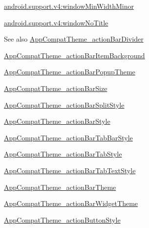 {\ttfamily \hyperlink{classandroid_1_1support_1_1v4_1_1R_1_1styleable_a49209af19fab1feaef6b49e695bf15d0}{android.\+support.\+v4\+:window\+Min\+Width\+Minor}}

{\ttfamily \hyperlink{classandroid_1_1support_1_1v4_1_1R_1_1styleable_a2434c4c955064f1b931a1059e587e1bb}{android.\+support.\+v4\+:window\+No\+Title}}

\begin{DoxySeeAlso}{See also}
\hyperlink{classandroid_1_1support_1_1v4_1_1R_1_1styleable_a0732bf3940b6c83753703acb180467fb}{App\+Compat\+Theme\+\_\+action\+Bar\+Divider} 

\hyperlink{classandroid_1_1support_1_1v4_1_1R_1_1styleable_a60558b418ddb9737883935cae40a928c}{App\+Compat\+Theme\+\_\+action\+Bar\+Item\+Background} 

\hyperlink{classandroid_1_1support_1_1v4_1_1R_1_1styleable_add3e5d5f9d1b972dd09d10ff0cc47d4d}{App\+Compat\+Theme\+\_\+action\+Bar\+Popup\+Theme} 

\hyperlink{classandroid_1_1support_1_1v4_1_1R_1_1styleable_aa92fde6683d052bff4e488f9f4dfdacc}{App\+Compat\+Theme\+\_\+action\+Bar\+Size} 

\hyperlink{classandroid_1_1support_1_1v4_1_1R_1_1styleable_ab3556694f1ba3adfd224a083e4c5b5b2}{App\+Compat\+Theme\+\_\+action\+Bar\+Split\+Style} 

\hyperlink{classandroid_1_1support_1_1v4_1_1R_1_1styleable_abfc7ed80904100dcd77301a5d21b8e1f}{App\+Compat\+Theme\+\_\+action\+Bar\+Style} 

\hyperlink{classandroid_1_1support_1_1v4_1_1R_1_1styleable_a53ff434fe900f2e065169c843ae14dd4}{App\+Compat\+Theme\+\_\+action\+Bar\+Tab\+Bar\+Style} 

\hyperlink{classandroid_1_1support_1_1v4_1_1R_1_1styleable_ace82d68d7bf21eba34ee1fc9395ad742}{App\+Compat\+Theme\+\_\+action\+Bar\+Tab\+Style} 

\hyperlink{classandroid_1_1support_1_1v4_1_1R_1_1styleable_af037c9c5d52f2269044bf14075a0a624}{App\+Compat\+Theme\+\_\+action\+Bar\+Tab\+Text\+Style} 

\hyperlink{classandroid_1_1support_1_1v4_1_1R_1_1styleable_a0a71bc29ce92a20e2a10e528565e55bf}{App\+Compat\+Theme\+\_\+action\+Bar\+Theme} 

\hyperlink{classandroid_1_1support_1_1v4_1_1R_1_1styleable_a0d30112c3d0cc880197dd311dbbf7def}{App\+Compat\+Theme\+\_\+action\+Bar\+Widget\+Theme} 

\hyperlink{classandroid_1_1support_1_1v4_1_1R_1_1styleable_a80982be55634192a193cf55c01a21de4}{App\+Compat\+Theme\+\_\+action\+Button\+Style} 


\end{DoxySeeAlso}
